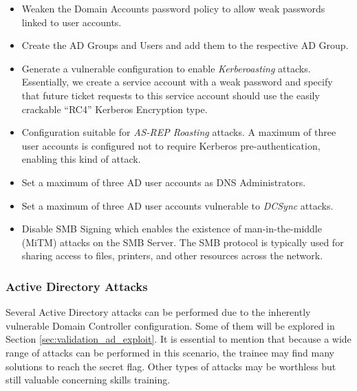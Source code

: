 \begin{itemize}
    \item Weaken the Domain Accounts password policy to allow weak passwords linked to user accounts.
    \item Create the AD Groups and Users and add them to the respective AD Group.
    \item Generate a vulnerable configuration to enable \textit{Kerberoasting} attacks. Essentially, we create a service account with a weak password and specify that future ticket requests to this service account should use the easily crackable ``RC4'' Kerberos Encryption type.
    \item Configuration suitable for \textit{AS-REP Roasting} attacks. A maximum of three user accounts is configured not to require Kerberos pre-authentication, enabling this kind of attack.
    \item Set a maximum of three AD user accounts as DNS Administrators.
    \item Set a maximum of three AD user accounts vulnerable to \textit{DCSync} attacks.
    \item Disable SMB Signing which enables the existence of man-in-the-middle (MiTM) attacks on the SMB Server. The SMB protocol is typically used for sharing access to files, printers, and other resources across the network.
\end{itemize}

\subsubsection{Active Directory Attacks} \label{sec:validation_ad_attacks}

Several Active Directory attacks can be performed due to the inherently vulnerable Domain Controller configuration. Some of them will be explored in Section \ref{sec:validation_ad_exploit}. It is essential to mention that because a wide range of attacks can be performed in this scenario, the trainee may find many solutions to reach the secret flag. Other types of attacks may be worthless but still valuable concerning skills training.

